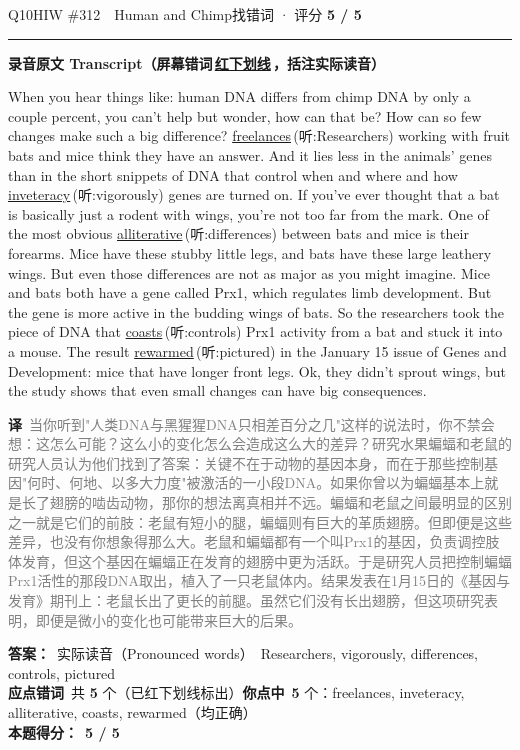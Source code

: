 \documentclass[11pt]{article}
\newcommand{\ptesub}[1]{%
  \par\needspace{2\baselineskip}\smallskip
  {\color{cAccent}\rule[-0.2ex]{3pt}{1.05em}}\hspace{6pt}%
  {\bfseries\color{cHead}#1}\par\nopagebreak\smallskip}
\newcommand{\zh}[1]{{\footnotesize\textcolor{cNote}{\textbf{译}}\ \textcolor{gray}{#1}}}
\newcommand{\hiw}[2]{{\color{cWrong}\uline{#1}}\,{\footnotesize\color{cFix}(听:#2)}} %
\begin{document}
\begin{qblock}{Q10\quad HIW \#312\ \ Human and Chimp}{找错词 · 评分 \textcolor{cAccent}{\bfseries 5 / 5}}
\ptesub{录音原文 Transcript（屏幕错词\,{\color{cWrong}\uline{红下划线}}\,，括注实际读音）}
\begin{promptbox}
When you hear things like: human DNA differs from chimp DNA by only a couple percent, you can't help but wonder, how can that be? How can so few changes make such a big difference? \hiw{freelances}{Researchers} working with fruit bats and mice think they have an answer. And it lies less in the animals' genes than in the short snippets of DNA that control when and where and how \hiw{inveteracy}{vigorously} genes are turned on. If you've ever thought that a bat is basically just a rodent with wings, you're not too far from the mark. One of the most obvious \hiw{alliterative}{differences} between bats and mice is their forearms. Mice have these stubby little legs, and bats have these large leathery wings. But even those differences are not as major as you might imagine. Mice and bats both have a gene called Prx1, which regulates limb development. But the gene is more active in the budding wings of bats. So the researchers took the piece of DNA that \hiw{coasts}{controls} Prx1 activity from a bat and stuck it into a mouse. The result \hiw{rewarmed}{pictured} in the January 15 issue of Genes and Development: mice that have longer front legs. Ok, they didn't sprout wings, but the study shows that even small changes can have big consequences.
\end{promptbox}
\zh{当你听到"人类DNA与黑猩猩DNA只相差百分之几"这样的说法时，你不禁会想：这怎么可能？这么小的变化怎么会造成这么大的差异？研究水果蝙蝠和老鼠的研究人员认为他们找到了答案：关键不在于动物的基因本身，而在于那些控制基因"何时、何地、以多大力度"被激活的一小段DNA。如果你曾以为蝙蝠基本上就是长了翅膀的啮齿动物，那你的想法离真相并不远。蝙蝠和老鼠之间最明显的区别之一就是它们的前肢：老鼠有短小的腿，蝙蝠则有巨大的革质翅膀。但即便是这些差异，也没有你想象得那么大。老鼠和蝙蝠都有一个叫Prx1的基因，负责调控肢体发育，但这个基因在蝙蝠正在发育的翅膀中更为活跃。于是研究人员把控制蝙蝠Prx1活性的那段DNA取出，植入了一只老鼠体内。结果发表在1月15日的《基因与发育》期刊上：老鼠长出了更长的前腿。虽然它们没有长出翅膀，但这项研究表明，即便是微小的变化也可能带来巨大的后果。}
\par\smallskip
\textbf{答案：}\ 实际读音（Pronounced words）\ {\color{cFix}Researchers, vigorously, differences, controls, pictured}\\
\textbf{应点错词}\ 共 \textbf{5} 个（已红下划线标出）\qquad\textbf{你点中}\ \textbf{5} 个：freelances, inveteracy, alliterative, coasts, rewarmed（均正确）\\[2pt]\textbf{本题得分：}\ {\color{cAccent}\bfseries 5 / 5}
\end{qblock}
\end{document}

